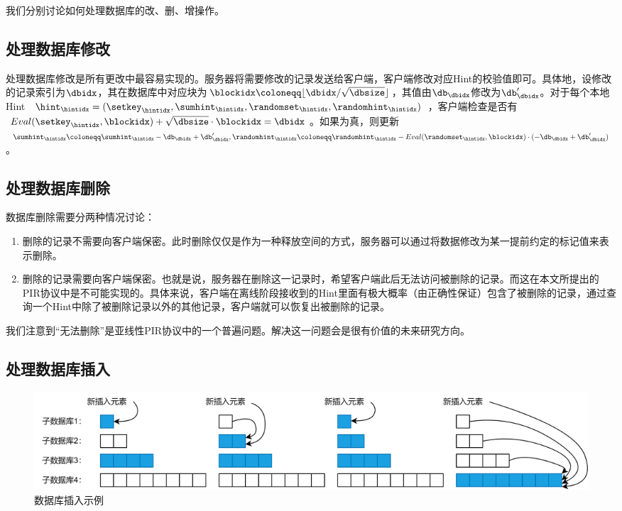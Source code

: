我们分别讨论如何处理数据库的改、删、增操作。

\subsection{处理数据库修改}
处理数据库修改是所有更改中最容易实现的。服务器将需要修改的记录发送给客户端，客户端修改对应Hint的校验值即可。具体地，设修改的记录索引为$\dbidx$，其在数据库中对应块为$\blockidx\coloneqq \lfloor \dbidx/\sqrt{\dbsize}\rfloor$，其值由$\db_\dbidx$修改为$\db_\dbidx'$。对于每个本地Hint $\hint_\hintidx = (\setkey_\hintidx,\sumhint_\hintidx,\randomset_\hintidx,\randomhint_\hintidx)$，客户端检查是否有 $Eval(\setkey_\hintidx, \blockidx) + \sqrt{\dbsize}\cdot \blockidx = \dbidx $。如果为真，则更新$\sumhint_\hintidx \coloneqq \sumhint_\hintidx - \db_{\dbidx} + \db_{\dbidx}', \randomhint_\hintidx \coloneqq \randomhint_\hintidx - Eval(\randomset_\hintidx,\blockidx)\cdot(-\db_{\dbidx} + \db_{\dbidx}')$。

\subsection{处理数据库删除}
数据库删除需要分两种情况讨论：
\begin{enumerate}
    \item 删除的记录不需要向客户端保密。此时删除仅仅是作为一种释放空间的方式，服务器可以通过将数据修改为某一提前约定的标记值来表示删除。
    \item 删除的记录需要向客户端保密。也就是说，服务器在删除这一记录时，希望客户端此后无法访问被删除的记录。而这在本文所提出的PIR协议中是不可能实现的。具体来说，客户端在离线阶段接收到的Hint里面有极大概率（由正确性保证）包含了被删除的记录，通过查询一个Hint中除了被删除记录以外的其他记录，客户端就可以恢复出被删除的记录。
\end{enumerate}

我们注意到“无法删除”是亚线性PIR协议中的一个普遍问题。解决这一问题会是很有价值的未来研究方向。

\subsection{处理数据库插入}

\begin{figure}
    \centering
    \includegraphics[width=0.8\linewidth]{figure/瀑布式插入.png}
    \caption{数据库插入示例}
    \label{fig:cascade-insertion}
\end{figure}

